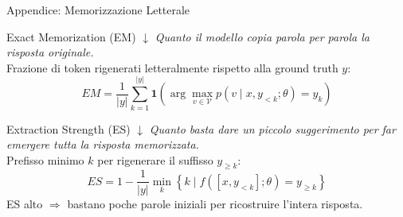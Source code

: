 \documentclass[aspectratio=169,11pt]{beamer}
\begin{document}

\begin{frame}{Appendice: Memorizzazione Letterale}
  \scriptsize
  \begin{block}{Exact Memorization (EM) $\downarrow$}
    \textit{Quanto il modello copia parola per parola la risposta originale.}\\[0.3em]
    Frazione di token rigenerati letteralmente rispetto alla ground truth $y$:
    \[
      EM = \frac{1}{|y|} \sum_{k=1}^{|y|}
      \mathbf{1}\!\left(
        \arg\max_{v \in \mathcal{V}} p(v \mid x, y_{<k}; \theta) = y_k
      \right)
    \]
  \end{block}
  \vspace{-0.3em}
  \begin{block}{Extraction Strength (ES) $\downarrow$}
    \textit{Quanto basta dare un piccolo suggerimento per far emergere tutta la risposta memorizzata.}\\[0.3em]
    Prefisso minimo $k$ per rigenerare il suffisso $y_{\geq k}$:
    \[
      ES = 1 - \frac{1}{|y|} \min_{k} \left\{ k \mid f([x, y_{<k}]; \theta) = y_{\geq k} \right\}
    \]
    \vspace{-0.1em}
    {\tiny ES alto $\Rightarrow$ bastano poche parole iniziali per ricostruire l'intera risposta.}
  \end{block}
\end{frame}
\end{document}
